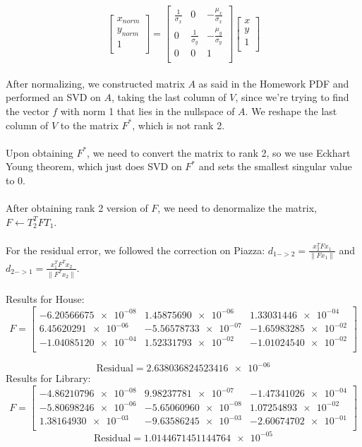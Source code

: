 \documentclass{article}\usepackage{amsmath,amssymb,amsthm,tikz,tkz-graph,color,chngpage,soul,hyperref,csquotes,graphicx,floatrow}\newcommand*{\QEDB}{\hfill\ensuremath{\square}}\newtheorem*{prop}{Proposition}\renewcommand{\theenumi}{\alph{enumi}}\usepackage[shortlabels]{enumitem}\usepackage[nobreak=true]{mdframed}\usetikzlibrary{matrix,calc}\MakeOuterQuote{"}\usepackage[margin=0.95in]{geometry} \newtheorem{theorem}{Theorem}
\begin{document}
\begin{mdframed}
\[ 
\begin{bmatrix}
    x_{norm} \\
    y_{norm} \\
    1 \\
  \end{bmatrix}
  =
\begin{bmatrix}
    \frac{1}{\sigma_{x}} & 0 & -\frac{\mu_{x}}{\sigma_{x}} \\
    0 & \frac{1}{\sigma_{y}} & -\frac{\mu_{y}}{\sigma_{y}} \\
    0 & 0 & 1 \\
\end{bmatrix}
\begin{bmatrix}
    x \\
    y \\
    1 \\
\end{bmatrix}
\]
\\After normalizing, we constructed matrix $ A $ as said in the Homework PDF and performed an SVD on $ A $, taking the last column of $ V $, since we're trying to find the vector $f$ with norm 1 that lies in the nullspace of $A$. We reshape the last column of $ V $ to the matrix $ F^* $, which is not rank 2.\\\\ Upon obtaining $ F^* $, we need to convert the matrix to rank 2, so we use Eckhart Young theorem, which just does SVD on $ F^* $ and sets the smallest singular value to 0. \\\\  After obtaining rank 2 version of $ F $, we need to denormalize the matrix, $ F \leftarrow T^{T}_{2}FT_{1} $. \\\\ For the residual error, we followed the correction on Piazza: $ d_{1->2} = \frac{x_2^TFx_1}{\|Fx_1\|} $ and $d_{2->1} = \frac{x_1^TF^Tx_2}{\|F^Tx_2\|}$. \\\\ Results for House:
\[ F = 
\begin{bmatrix}
 \num{-6.20566675e-08} & \num{1.45875690e-06} & \num{1.33031446e-04} \\
 \num{6.45620291e-06} & \num{-5.56578733e-07} & \num{-1.65983285e-02} \\
 \num{-1.04085120e-04} & \num{1.52331793e-02} & \num{-1.01024540e-02} \\
\end{bmatrix}
\]

\[ \text{Residual}= \num{2.638036824523416e-06} \]
Results for Library:
\[ F = 
\begin{bmatrix}
 \num{-4.86210796e-08} & \num{9.98237781e-07} & \num{-1.47341026e-04} \\
 \num{-5.80698246e-06} & \num{-5.65060960e-08} & \num{1.07254893e-02} \\
 \num{1.38164930e-03} & \num{-9.63586245e-03} & \num{-2.60674702e-01} \\
\end{bmatrix}
\]
\[ \text{Residual}= \num{1.0144671451144764e-05} \] 

\end{mdframed}
\end{document}
